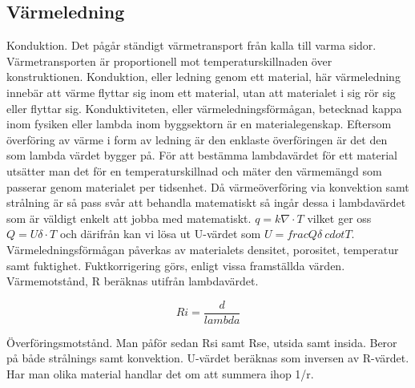 \subsection{Värmeledning}
Konduktion. Det pågår ständigt värmetransport från kalla till varma sidor. Värmetransporten är proportionell mot temperaturskillnaden över konstruktionen. Konduktion, eller ledning genom ett material, här värmeledning innebär att värme flyttar sig inom ett material, utan att materialet i sig rör sig eller flyttar sig. Konduktiviteten, eller värmeledningsförmågan, betecknad kappa inom fysiken eller lambda inom byggsektorn är en materialegenskap. Eftersom överföring av värme i form av ledning är den enklaste överföringen är det den som lambda värdet bygger på. För att bestämma lambdavärdet för ett material utsätter man det för en temperaturskillnad och mäter den värmemängd som passerar genom materialet per tidsenhet. Då värmeöverföring via konvektion samt strålning är så pass svår att behandla matematiskt så ingår dessa i lambdavärdet som är väldigt enkelt att jobba med matematiskt. $q=k \nabla \cdot T$ vilket ger oss $Q=U \delta \cdot T$ och därifrån kan vi lösa ut U-värdet som $U = frac{Q}{\delta\ cdot T}$. Värmeledningsförmågan påverkas av materialets densitet, porositet, temperatur samt fuktighet. Fuktkorrigering görs, enligt vissa framställda värden. Värmemotstånd, R beräknas utifrån lambdavärdet.

\begin{equation}
Ri=\frac{d}{lambda}
\end{equation}

Överföringsmotstånd. Man påför sedan Rsi samt Rse, utsida samt insida. Beror på både strålnings samt konvektion. U-värdet beräknas som inversen av R-värdet. Har man olika material handlar det om att summera ihop 1/r.
